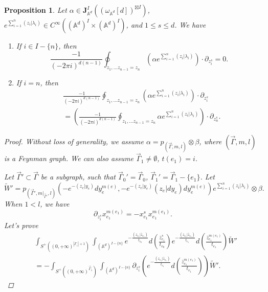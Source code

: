 \documentclass[11pt]{amsart}
\newtheorem{prop}[thm]{Proposition}
\theoremstyle{definition}
\theoremstyle{remark}
\numberwithin{equation}{section}
\begin{document}
\begin{prop}\label{residue 0}
    Let $\alpha\in \mathbf{J}^{ I}_{\mathbb{A}^{d}}((\omega_{\mathbb{A}^{d}}[d])^{\boxtimes I})$, $e^{\sum\limits_{i=1}^{n}(z_{i}|\lambda_{i})}\in C^{\infty}((\mathbb{A}^{d})^{ I}\times (\mathbb{A}^{d})^{ I})$, and $1\leq s\leq d$. We have

    \begin{enumerate}
        \item If $i\in I-\{n\}$, then
        $$
        \frac{-1}{(-2\pi i)^{d(n-1)}}\oint_{z_{1},\dots z_{n-1}=z_{n}}\left(\alpha e^{\sum\limits_{i=1}^{n}(z_{i}|\lambda_{i})}\right)\cdot \partial_{z_{i}^{s}}=0.
        $$
        \item If $i=n$, then
        \begin{align*}
            &\frac{-1}{(-2\pi i)^{d(n-1)}}\oint_{z_{1},\dots z_{n-1}=z_{n}}\left(\alpha e^{\sum\limits_{i=1}^{n}(z_{i}|\lambda_{i})}\right)\cdot \partial_{z_{i}^{s}}\\
            &=\left(\frac{-1}{(-2\pi i)^{d(n-1)}}\oint_{z_{1},\dots z_{n-1}=z_{n}}\alpha e^{\sum\limits_{i=1}^{n}(z_{i}|\lambda_{i})}\right)\cdot \partial_{z_{n}^{s}}.
        \end{align*}
    \end{enumerate}
    \begin{proof}
        Without loss of generality, we assume $\alpha=p_{(\vec{\Gamma},m,l)}\otimes\beta$, where $(\vec{\Gamma},m,l)$ is a Feynman graph. We can also assume $\vec{\Gamma}_{1}\neq\emptyset$, $t(e_{1})=i$.

        Let $\vec{\Gamma}'\subset\vec{\Gamma}$ be a subgraph, such that $\vec{\Gamma}_{0}'=\vec{\Gamma}_{0}$, $\vec{\Gamma}_{1}'=\vec{\Gamma}_{1}-\{e_{1}\}$. Let
        $$
        \tilde{W}'=p_{(\vec{\Gamma}',m|_{\vec{\Gamma}'},l)}(-e^{-(z_{e}| y_{e})}dy_{e}^{m(e)},-e^{-(z_{e}| y_{e})}(z_{e}| dy_{e})dy_{e}^{m(e)})e^{\sum\limits_{i=1}^{n}(z_{i}|\lambda_{i})}\otimes \beta.
        $$
        When $1<l$, we have
        $$
        \partial_{z_{i}^{s}}x_{e_{1}}^{m(e_{1})}=-x_{e_{1}}^{s}x_{e_{1}}^{m(e_{1})}.
        $$
        Let's prove
        \begin{align*}
            &\int_{S^{+}((0,+\infty)^{|\Gamma_{_{1}}|+1})}\int_{(\mathbb{A}^{d})^{ I-\{n\}}}
            e^{-\frac{(z_{e_{1}}| \bar{z}_{e_{1}})}{t_{e_{0}}}}d(\frac{\bar{z}_{e_{1}}^{s}}{t_{e_{0}}})e^{-\frac{(z_{e_{1}}|\bar{z}_{e_{1}})}{t_{e_{1}}}}d(\frac{\bar{z}_{e_{1}}^{m(e_{1})}}{t_{e_{1}}})\tilde{W}'\\
            &=
            -\int_{S^{+}((0,+\infty)^{\vec{\Gamma}_{1}})}\int_{(\mathbb{A}^{d})^{ I-\{n\}}}\partial_{z_{i}^{s}}\left(e^{-\frac{(z_{e_{1}}|\bar{z}_{e_{1}})}{t_{e_{1}}}}d(\frac{\bar{z}_{e_{1}}^{m(e_{1})}}{t_{e_{1}}})\right)\tilde{W}'.
        \end{align*}


\end{proof}
\end{prop}
\end{document}
